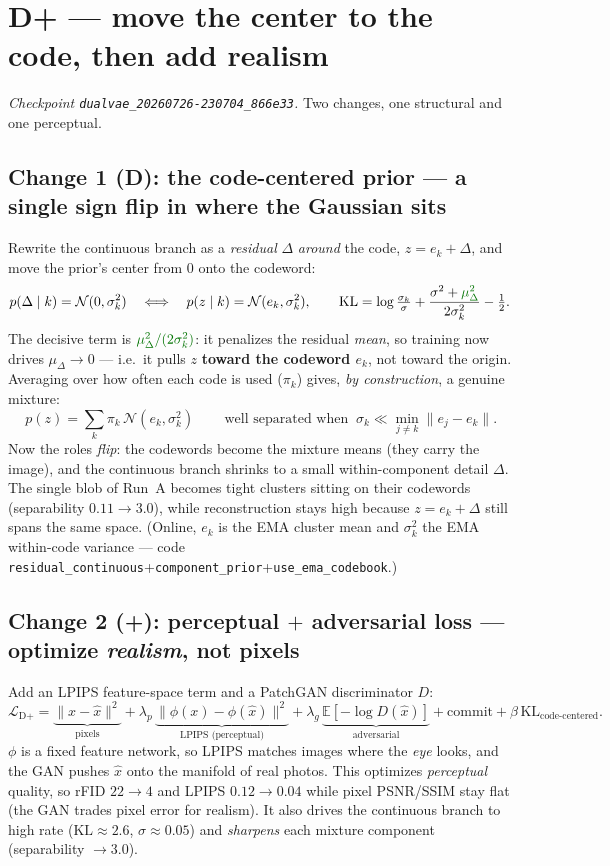 \documentclass[11pt]{article}
\newcommand{\code}[1]{\texttt{#1}}
\newcommand{\hl}[1]{\textcolor{good}{#1}}
\begin{document}
\section*{D+ --- move the center to the code, then add realism}
\emph{Checkpoint \code{dualvae\_20260726-230704\_866e33}.} Two changes, one structural and one perceptual.

\subsection*{Change 1 (D): the code-centered prior --- a single sign flip in where the Gaussian sits}
Rewrite the continuous branch as a \emph{residual} $\Delta$ \emph{around} the code, $z=e_k+\Delta$, and
move the prior's center from $0$ onto the codeword:
\[
p(\Delta\mid k)=\mathcal N(0,\sigma_k^2)\quad\Longleftrightarrow\quad p(z\mid k)=\mathcal N(e_k,\sigma_k^2),
\qquad
\mathrm{KL}=\log\tfrac{\sigma_k}{\sigma}+\frac{\sigma^2+\hl{\mu_\Delta^2}}{2\sigma_k^2}-\tfrac12 .
\]
The decisive term is $\hl{\mu_\Delta^2/(2\sigma_k^2)}$: it penalizes the residual \emph{mean}, so training
now drives $\mu_\Delta\to0$ --- i.e.\ it pulls $z$ \textbf{toward the codeword $e_k$}, not toward the origin.
Averaging over how often each code is used ($\pi_k$) gives, \emph{by construction}, a genuine mixture:
\[
\boxed{\,p(z)=\sum_k \pi_k\,\mathcal N(e_k,\sigma_k^2)\,}\qquad\text{well separated when }\ \sigma_k\ll\min_{j\neq k}\lVert e_j-e_k\rVert .
\]
Now the roles \emph{flip}: the codewords become the mixture means (they carry the image), and the
continuous branch shrinks to a small within-component detail $\Delta$. The single blob of Run~A becomes
tight clusters sitting on their codewords (\hl{separability $0.11\to3.0$}), while reconstruction stays
high because $z=e_k+\Delta$ still spans the same space. (Online, $e_k$ is the EMA cluster mean and
$\sigma_k^2$ the EMA within-code variance --- code \code{residual\_continuous}+\code{component\_prior}+\code{use\_ema\_codebook}.)

\subsection*{Change 2 (+): perceptual $+$ adversarial loss --- optimize \emph{realism}, not pixels}
Add an LPIPS feature-space term and a PatchGAN discriminator $D$:
\[
\mathcal L_{\text{D+}}=\underbrace{\lVert x-\hat x\rVert^2}_{\text{pixels}}+\lambda_p\,\underbrace{\lVert \phi(x)-\phi(\hat x)\rVert^2}_{\text{LPIPS (perceptual)}}+\lambda_g\,\underbrace{\mathbb E[-\log D(\hat x)]}_{\text{adversarial}}+\text{commit}+\beta\,\mathrm{KL}_{\text{code-centered}} .
\]
$\phi$ is a fixed feature network, so LPIPS matches images where the \emph{eye} looks, and the GAN
pushes $\hat x$ onto the manifold of real photos. This optimizes \emph{perceptual} quality, so
\hl{rFID $22\to4$} and \hl{LPIPS $0.12\to0.04$} while pixel PSNR/SSIM stay flat (the GAN trades pixel
error for realism). It also drives the continuous branch to high rate ($\mathrm{KL}\approx2.6$,
$\sigma\approx0.05$) and \emph{sharpens} each mixture component (separability $\to3.0$).
\end{document}
